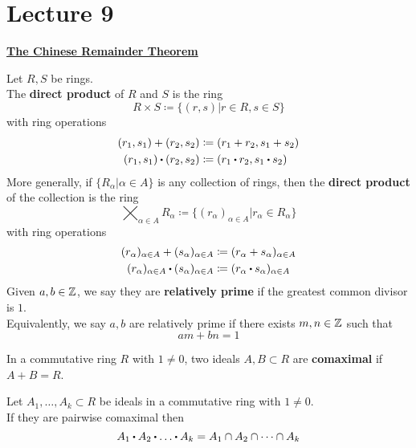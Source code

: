 \documentclass[../Main.tex]{subfiles}
\begin{document}
\chapter{Lecture 9}
\underline{\textbf{\Large The Chinese Remainder Theorem}}
\begin{dfn}[title = Direct Product]
	Let $R,S$ be rings.\\
	The \textbf{direct product} of $R$ and $S$ is the ring
	\[R\times S \coloneqq \{(r,s)|r\in R, s\in S \}\]
	with ring operations
	\begin{align*}
		(r_1,s_1)+(r_2,s_2)&\coloneqq (r_1+r_2,s_1+s_2)\\
		(r_1,s_1)\rdot (r_2,s_2)&\coloneqq (r_1\rdot r_2,s_1\rdot s_2)
	\end{align*}
	More generally, if $\{R_\alpha|\alpha\in A\}$ is any collection of rings, then the \textbf{direct product} of the collection is the ring
	\[\bigtimes_{\alpha \in A}R_\alpha \coloneqq \{(r_\alpha)_{\alpha\in A}| r_\alpha \in R_\alpha\}\]
	with ring operations
	\begin{align*}
	(r_\alpha)_{\alpha\in A}+(s_\alpha)_{\alpha\in A}&\coloneqq (r_\alpha +s_\alpha)_{\alpha\in A}\\
	(r_\alpha)_{\alpha\in A}\rdot (s_\alpha)_{\alpha\in A}&\coloneqq (r_\alpha \rdot s_\alpha)_{\alpha\in A}\\
	\end{align*}
	Given $a,b\in \mathbb{Z}$, we say they are \textbf{relatively prime} if the greatest common divisor is $1$.\\
	Equivalently, we say $a,b$ are relatively prime if there exists $m,n\in\mathbb{Z}$ such that \[am+bn=1\]
\end{dfn}
\begin{dfn}[title = Comaximal Ideals]
	In a commutative ring $R$ with $1\ne 0$, two ideals $A,B\subset R$ are \textbf{comaximal} if $A+B=R$.
\end{dfn}
\begin{thm}
	Let $A_1,\dots,A_k\subset R$ be ideals in a commutative ring with $1\ne 0$.\\
	If they are pairwise comaximal then
	\[A_1\rdot A_2\rdot \dots \rdot A_k = A_1 \cap A_2 \cap \dots \cap A_k\]
\end{thm}
\end{document}
